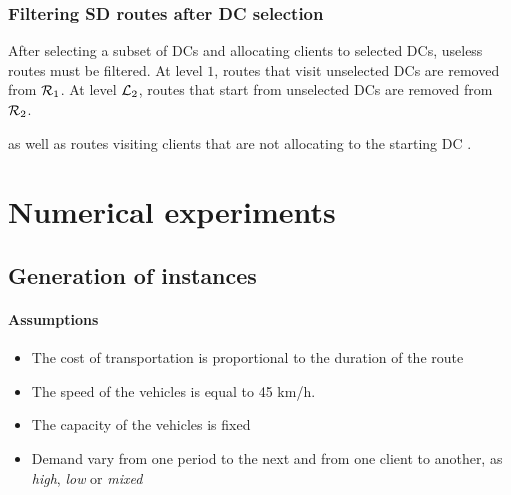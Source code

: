 \documentclass[a4paper,10pt]{article}
\begin{document}
\begin{linenumbers}







\newpage

\subsubsection{Filtering SD routes after DC selection}

After selecting a subset of DCs and allocating clients to selected DCs, useless routes must be filtered. 
At level $1$, routes that visit unselected DCs are removed from $\mathcal{R}_1$. 
At level $\mathcal{L}_2$, routes that start from unselected DCs are removed from $\mathcal{R}_2$. 

as well as routes visiting clients that are not allocating to the starting DC . 




\section{Numerical experiments}
\label{sec:expe}
\subsection{Generation of instances}

\paragraph{Assumptions}
\begin{itemize}
    \item The cost of transportation is proportional to the duration of the route
    \item The speed of the vehicles is equal to 45 km/h.
    \item The capacity of the vehicles is fixed
    \item Demand vary from one period to the next and from one client to another, as {\em high}, {\em low} or {\em mixed}
    \end{itemize}



\end{linenumbers}
\end{document}

